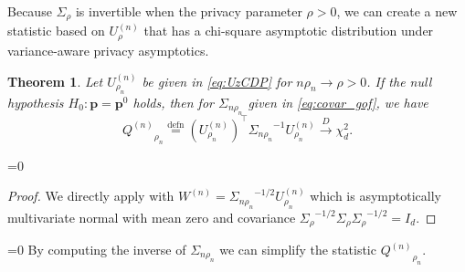 \documentclass[twoside,letterpaper]{article} \usepackage{aistats2017}
\newtheorem{theorem}{Theorem}[section]
\theoremstyle{definition}
\theoremstyle{remark}
\begin{document}
Because  ${{\Sigma}_{{\rho}}}$ is invertible when the privacy parameter $\rho> 0$, we can create a new statistic based on ${U^{(n)}_{{\rho}}}$ that has a chi-square asymptotic distribution under variance-aware privacy asymptotics.
\begin{theorem}
Let ${U^{(n)}_{{\rho_n}}}$ be given in \eqref{eq:UzCDP} for $n \rho_n \to\rho >0$.  If the null hypothesis $H_0: {\mathbf{p}} = {{\mathbf{p}}^0}$ holds, then for $\Sigma_{ n\rho_n}$ given in \eqref{eq:covar_gof}, we have
\begin{equation}
{Q^{({n})}}_{\rho_n} \stackrel{\mathrm{defn}}{=} \left({U^{(n)}_{{\rho_n}}}\right)^\intercal {{\Sigma}_{{n \rho_n}}}^{-1} {U^{(n)}_{{\rho_n}}} \stackrel{D}{\to} \chi^2_d.
\label{eq:new_stat1}
\end{equation}
\end{theorem}
=0
\begin{proof}
We directly apply  with $W^{(n)} = {{\Sigma}_{{n \rho_n}}}^{-1/2}{U^{(n)}_{{\rho_n}}}$ which is asymptotically multivariate normal with mean zero and covariance ${{\Sigma}_{{\rho}}}^{-1/2}{{\Sigma}_{{\rho}}}{{\Sigma}_{{\rho}}}^{-1/2} = I_d$.  
\end{proof}
\fi

=0
By computing the inverse of ${{\Sigma}_{{n\rho_n}}}$ we can simplify the statistic  ${Q^{({n})}}_{\rho_n}$. 
\end{document}
